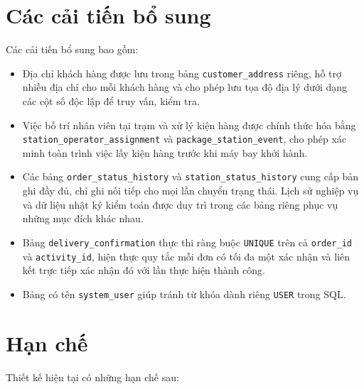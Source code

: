 \section{Các cải tiến bổ sung}\label{s:improvements}

Các cải tiến bổ sung bao gồm:

\begin{itemize}
    \item Địa chỉ khách hàng được lưu trong bảng \texttt{customer\_address} riêng, hỗ trợ nhiều địa chỉ cho mỗi khách hàng và cho phép lưu tọa độ địa lý dưới dạng các cột số độc lập để truy vấn, kiểm tra.
    \item Việc bố trí nhân viên tại trạm và xử lý kiện hàng được chính thức hóa bằng \texttt{station\_operator\_assignment} và \texttt{package\_station\_event}, cho phép xác minh toàn trình việc lấy kiện hàng trước khi máy bay khởi hành.
    \item Các bảng \texttt{order\_status\_history} và \texttt{station\_status\_history} cung cấp bản ghi đầy đủ, chỉ ghi nối tiếp cho mọi lần chuyển trạng thái. Lịch sử nghiệp vụ và dữ liệu nhật ký kiểm toán được duy trì trong các bảng riêng phục vụ những mục đích khác nhau.
    \item Bảng \texttt{delivery\_confirmation} thực thi ràng buộc \texttt{UNIQUE} trên cả \texttt{order\_id} và \texttt{activity\_id}, hiện thực quy tắc mỗi đơn có tối đa một xác nhận và liên kết trực tiếp xác nhận đó với lần thực hiện thành công.
    \item Bảng có tên \texttt{system\_user} giúp tránh từ khóa dành riêng \texttt{USER} trong SQL.
\end{itemize}

\section{Hạn chế}\label{s:limitations}

Thiết kế hiện tại có những hạn chế sau:

